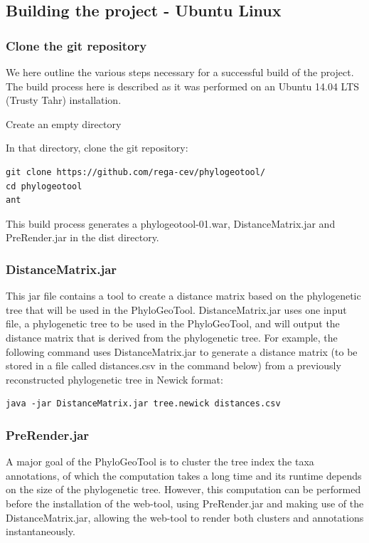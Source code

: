 \documentclass[a4paper, 11pt]{article} %
\begin{document}
\subsection{Building the project - Ubuntu Linux}

\subsubsection{Clone the git repository}

We here outline the various steps necessary for a successful build of the project.
The build process here is described as it was performed on an Ubuntu 14.04 LTS (Trusty Tahr) installation.
\begin{itemize}
\item Create an empty directory
\item {In that directory, clone the git repository: 
\begin{verbatim}
git clone https://github.com/rega-cev/phylogeotool/
cd phylogeotool
ant
\end{verbatim}
\item This build process generates a phylogeotool-01.war, DistanceMatrix.jar and PreRender.jar in the dist directory.
}
\end{itemize}

\subsubsection{DistanceMatrix.jar}
\label{sec:dm}
This jar file contains a tool to create a distance matrix based on the phylogenetic tree that will be used in the PhyloGeoTool.
DistanceMatrix.jar uses one input file, a phylogenetic tree to be used in the PhyloGeoTool, and will output the distance matrix that is derived from the phylogenetic tree. %
For example, the following command uses DistanceMatrix.jar to generate a distance matrix (to be stored in a file called distances.csv in the command below) from a previously reconstructed phylogenetic tree in Newick format: 
\begin{verbatim}
java -jar DistanceMatrix.jar tree.newick distances.csv
\end{verbatim}

\subsubsection{PreRender.jar}
A major goal of the PhyloGeoTool is to cluster the tree index the taxa annotations, of which the computation takes a long time and its runtime depends on the size of the phylogenetic tree. 
However, this computation can be performed before the installation of the web-tool, using PreRender.jar and making use of the DistanceMatrix.jar, allowing the web-tool to render both clusters and annotations instantaneously.
\end{document}
